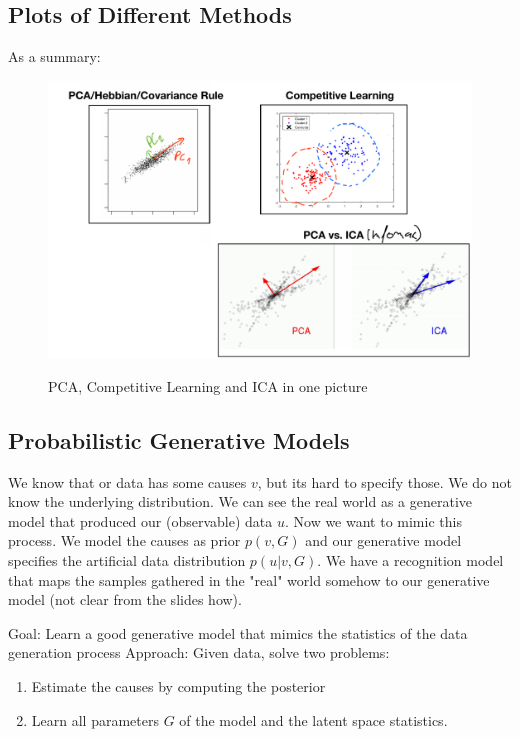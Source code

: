 \documentclass[main]{subfiles}
\begin{document}
\subsection{Plots of Different Methods}
As a summary:
\begin{figure}[H]
	\centering
	\includegraphics[width=0.9\linewidth]{07_UnsupervisedAndSelfsupervisedLearning/figures/summary-clustering.png}
	\label{fig:summary-clustering}
	\caption{PCA, Competitive Learning and ICA in one picture}
\end{figure}

\subsection{Probabilistic Generative Models}
We know that or data has some causes $v$, but its hard to specify those. We do not know the underlying distribution. We can see the real world as a generative model that produced our (observable) data $u$. Now we want to mimic this process. We model the causes as prior $p(v,G)$ and our generative model specifies the artificial data distribution $p(u|v,G)$. We have a recognition model that maps the samples gathered in the "real" world somehow to our generative model (not clear from the slides how).


Goal: Learn a good generative model that mimics the statistics of the data generation process
Approach: Given data, solve two problems:

\begin{enumerate}
    \item Estimate the causes by computing the posterior
    \item Learn all parameters $G$ of the model and the latent space statistics.
\end{enumerate}
\end{document}
